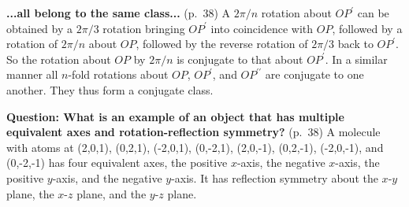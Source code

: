 {\bf ...all belong to the same class...} (p.\ 38) A $2\pi/n$ rotation about
$OP^\prime$ can be obtained by a $2\pi/3$ rotation bringing $OP^\prime$ into
coincidence with $OP$, followed by a rotation of $2\pi/n$ about $OP$,
followed by the reverse rotation of $2\pi/3$ back to $OP^\prime$. So the
rotation about $OP$ by $2\pi/n$ is conjugate to that about $OP^\prime$. In a
similar manner all $n$-fold rotations about $OP$, $OP^\prime$, and
$OP^{\prime\prime}$ are conjugate to one another. They thus form a
conjugate class.

{\bf Question: What is an example of an object that has multiple equivalent axes and rotation-reflection symmetry?} (p.\ 38)
A molecule with atoms at (2,0,1), (0,2,1), (-2,0,1), (0,-2,1), (2,0,-1), (0,2,-1), (-2,0,-1), and (0,-2,-1) has four equivalent axes, the positive $x$-axis, the negative $x$-axis, the positive $y$-axis, and the negative $y$-axis. It has reflection symmetry about the $x$-$y$ plane, the $x$-$z$ plane, and the $y$-$z$ plane.
